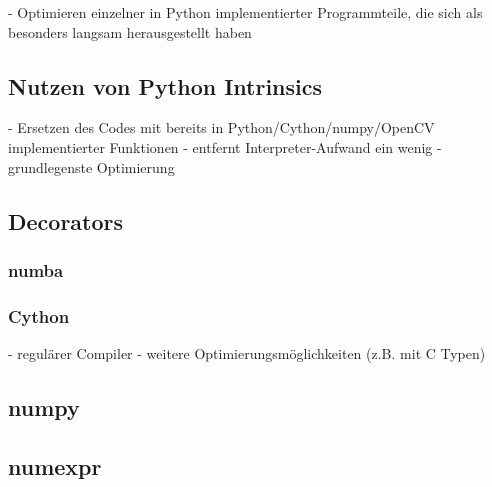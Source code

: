 \begin{correctmore}
	- Optimieren einzelner in Python implementierter Programmteile, die sich als besonders langsam herausgestellt haben
\end{correctmore}

\subsection{Nutzen von Python Intrinsics}

\begin{correctmore}
	- Ersetzen des Codes mit bereits in Python/Cython/numpy/OpenCV implementierter Funktionen
	- entfernt Interpreter-Aufwand ein wenig
	- grundlegenste Optimierung
\end{correctmore}

\subsection{Decorators}


\subsubsection{numba}


\subsubsection{Cython}

\begin{correctmore}
	- regulärer Compiler
	- weitere Optimierungsmöglichkeiten (z.B. mit C Typen)
\end{correctmore}

\subsection{numpy}


\subsection{numexpr}










